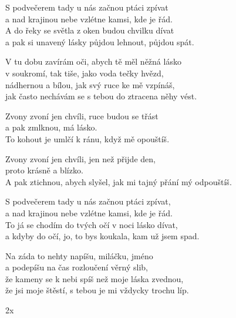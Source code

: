 
\ve{}
S podvečerem tady u nás začnou ptáci zpívat\\
a nad krajinou nebe vzlétne kamsi, kde je řád.\\
A do řeky se světla z oken budou chvilku dívat\\
a pak si unavený lásky půjdou lehnout, půjdou spát.

\ve{}
V tu dobu zavírám oči, abych tě měl něžná lásko\\
v soukromí, tak tiše, jako voda tečky hvězd,\\
nádhernou a bílou, jak svý ruce ke mě vzpínáš,\\
jak často nechávám se s tebou do ztracena něhy vést.

\cho{}
Zvony zvoní jen chvíli, ruce budou se třást\\
a pak zmlknou, má lásko.\\
To kohout je umlčí k ránu, když mě opouštíš. 

Zvony zvoní jen chvíli, jen než přijde den,\\
proto krásně a blízko.\\
A pak ztichnou, abych slyšel, jak mi tajný přání mý odpouštíš. 

\ve{}
S podvečerem tady u nás začnou ptáci zpívat,\\
a nad krajinou nebe vzlétne kamsi, kde je řád.\\
To já se chodím do tvých očí v noci lásko dívat,\\
a kdyby do očí, jo, to bys koukala, kam už jsem spad.

\ve{}
Na záda to nehty napíšu, miláčku, jméno\\
a podepíšu na čas rozloučení věrný slib,\\
že kameny se k nebi spíš než moje láska zvednou,\\
že jsi moje štěstí, s tebou je mi vždycky trochu líp.

\cho{} 2x

\esong

